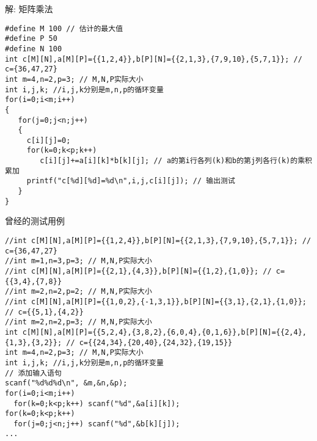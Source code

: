 \begin{frame}{解: 矩阵乘法}
\begin{lstlisting}
#define M 100 // 估计的最大值
#define P 50
#define N 100 
int c[M][N],a[M][P]={{1,2,4}},b[P][N]={{2,1,3},{7,9,10},{5,7,1}}; // c={36,47,27}
int m=4,n=2,p=3; // M,N,P实际大小
int i,j,k; //i,j,k分别是m,n,p的循环变量 
for(i=0;i<m;i++) 
{
   for(j=0;j<n;j++)
   {
     c[i][j]=0;
     for(k=0;k<p;k++) 
        c[i][j]+=a[i][k]*b[k][j]; // a的第i行各列(k)和b的第j列各行(k)的乘积累加 
     printf("c[%d][%d]=%d\n",i,j,c[i][j]); // 输出测试
   }
}
\end{lstlisting}
\end{frame}

\begin{frame}
\small{曾经的测试用例}
\begin{lstlisting}
//int c[M][N],a[M][P]={{1,2,4}},b[P][N]={{2,1,3},{7,9,10},{5,7,1}}; // c={36,47,27}
//int m=1,n=3,p=3; // M,N,P实际大小
//int c[M][N],a[M][P]={{2,1},{4,3}},b[P][N]={{1,2},{1,0}}; // c={{3,4},{7,8}}
//int m=2,n=2,p=2; // M,N,P实际大小
//int c[M][N],a[M][P]={{1,0,2},{-1,3,1}},b[P][N]={{3,1},{2,1},{1,0}}; // c={{5,1},{4,2}}
//int m=2,n=2,p=3; // M,N,P实际大小
int c[M][N],a[M][P]={{5,2,4},{3,8,2},{6,0,4},{0,1,6}},b[P][N]={{2,4},{1,3},{3,2}}; // c={{24,34},{20,40},{24,32},{19,15}}
int m=4,n=2,p=3; // M,N,P实际大小
int i,j,k; //i,j,k分别是m,n,p的循环变量  
// 添加输入语句
scanf("%d%d%d\n", &m,&n,&p);
for(i=0;i<m;i++)
  for(k=0;k<p;k++) scanf("%d",&a[i][k]);
for(k=0;k<p;k++)
  for(j=0;j<n;j++) scanf("%d",&b[k][j]);
...
\end{lstlisting}
\end{frame}  







